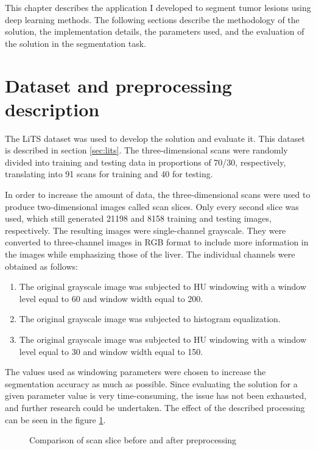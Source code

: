 
This chapter describes the application I developed to segment tumor lesions using deep learning methods. The following sections describe the methodology of the solution, the implementation details, the parameters used, and the evaluation of the solution in the segmentation task.



\section{Dataset and preprocessing description}


The LiTS dataset was used to develop the solution and evaluate it. This dataset is described in section \ref{sec:lits}. The three-dimensional scans were randomly divided into training and testing data in proportions of 70/30, respectively, translating into 91 scans for training and 40 for testing.

In order to increase the amount of data, the three-dimensional scans were used to produce two-dimensional images called scan slices. Only every second slice was used, which still generated 21198 and 8158 training and testing images, respectively. The resulting images were single-channel grayscale. They were converted to three-channel images in RGB format to include more information in the images while emphasizing those of the liver. The individual channels were obtained as follows:
\begin{enumerate}
    \item The original grayscale image was subjected to HU windowing with a window level equal to 60 and window width equal to 200.
    \item The original grayscale image was subjected to histogram equalization.
    \item The original grayscale image was subjected to HU windowing with a window level equal to 30 and window width equal to 150.

\end{enumerate}

The values used as windowing parameters were chosen to increase the segmentation accuracy as much as possible. Since evaluating the solution for a given parameter value is very time-consuming, the issue has not been exhausted, and further research could be undertaken. The effect of the described processing can be seen in the figure \ref{fig:preproc_effect}.

\begin{figure}%
    \centering
    \qquad
    \caption{Comparison of scan slice before and after preprocessing}%
    \label{fig:preproc_effect}%
\end{figure}


